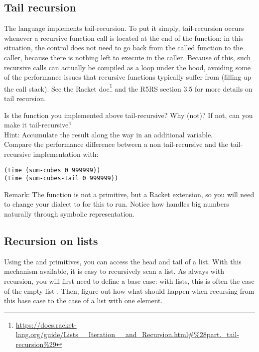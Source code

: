\documentclass{../../../tp}
\begin{document}
\subsection{Tail recursion}

The \scheme language implements tail-recursion. To put it simply, tail-recursion occurs whenever a recursive function call is located at the end of the function: in this situation, the control does not need to go back from the called function to the caller, because there is nothing left to execute in the caller. Because of this, such recursive calls can actually be compiled as a loop under the hood, avoiding some of the performance issues that recursive functions typically suffer from (filling up the call stack). See the Racket doc\footnote{\url{https://docs.racket-lang.org/guide/Lists\_\_Iteration\_\_and\_Recursion.html\#\%28part._tail-recursion\%29}} and the R5RS section 3.5 for more details on tail recursion.

\begin{instruction}
Is the  function you implemented above tail-recursive? Why (not)? If not, can you make it tail-recursive?\\

Hint: Accumulate the result along the way in an additional variable.\\

Compare the performance difference between a non tail-recursive  and the tail-recursive implementation  with:

\begin{verbatim}
(time (sum-cubes 0 999999))
(time (sum-cubes-tail 0 999999))
\end{verbatim}

Remark: The  function is not a \scheme primitive, but a Racket extension, so you will need to change your dialect to  for this to run. Notice how \scheme handles big numbers naturally through symbolic representation.
\end{instruction}


\subsection{Recursion on lists}

Using the \car and \cdr primitives, you can access the head and tail of a list. With this mechanism available, it is easy to recursively scan a list. As always with recursion, you will first need to define a base case: with lists, this is often the case of the empty list . Then, figure out how what should happen when recursing from this base case to the case of a list with one element.
\end{document}
